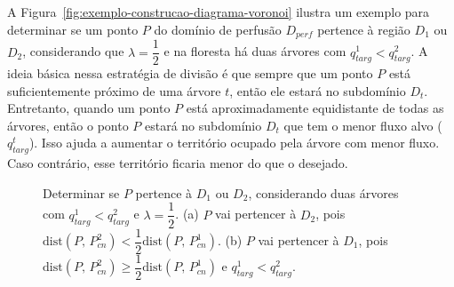 A Figura~\ref{fig:exemplo-construcao-diagrama-voronoi} ilustra um exemplo para determinar 
se um ponto $P$ do domínio de perfusão $D_{perf}$ pertence à região $D_1$ ou $D_2$,
considerando que $\lambda = \dfrac{1}{2}$ e na floresta há duas árvores com $q_{targ}^1 < q_{targ}^2$.
A ideia básica nessa estratégia de divisão é que sempre que um ponto 
$P$ está suficientemente próximo de uma árvore $t$, então ele estará no subdomínio
$D_t$. Entretanto, quando um ponto $P$ está aproximadamente equidistante
de todas as árvores, então o ponto $P$ estará no subdomínio $D_t$ que tem
o menor fluxo alvo ($q_{targ}^t$). Isso ajuda a aumentar o território ocupado pela
árvore com menor fluxo. Caso contrário, esse território ficaria
menor do que o desejado.

\clearpage

\begin{figure}[!htb]
  \centering \captiondelim{: }
  \caption{Determinar se $P$ pertence à $D_1$ ou $D_2$, considerando duas 
  árvores com $q_{targ}^1 < q_{targ}^2$ e $\lambda = \dfrac{1}{2}$.
  (a) $P$ vai pertencer à $D_2$, pois 
  $\mathrm{dist}(P,\,P_{cn}^2) < \dfrac{1}{2}\mathrm{dist}(P,\,P_{cn}^1)$.
  (b) $P$ vai pertencer à $D_1$, pois 
  $\mathrm{dist}(P,\,P_{cn}^2) \geq \dfrac{1}{2}\mathrm{dist}(P,\,P_{cn}^1)$
  e $q_{targ}^1 < q_{targ}^2$.
  }
  

\end{figure}
